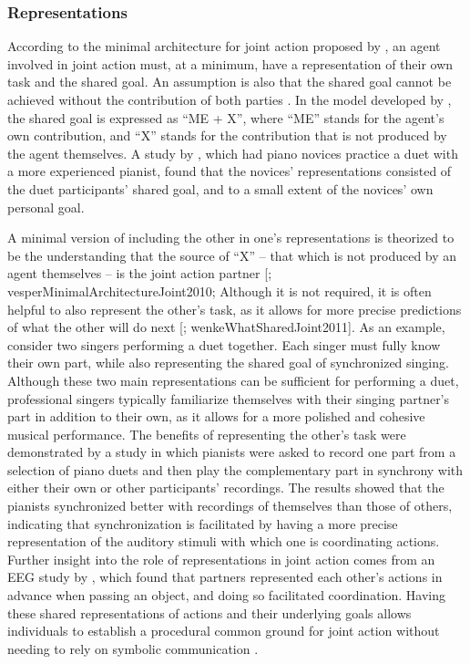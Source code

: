 \documentclass[10pt,a4paper,onecolumn]{article}
\begin{document}
\hypertarget{representations}{%
\subsubsection{Representations}\label{representations}}

According to the minimal architecture for joint action proposed by \textcite{vesperMinimalArchitectureJoint2010}, an agent involved in joint action must, at a minimum, have a representation of their own task and the shared goal. An assumption is also that the shared goal cannot be achieved without the contribution of both parties \autocite{vesperMinimalArchitectureJoint2010}. In the model developed by \textcite{vesperMinimalArchitectureJoint2010}, the shared goal is expressed as ``ME + X'', where ``ME'' stands for the agent's own contribution, and ``X'' stands for the contribution that is not produced by the agent themselves. A study by \textcite{loehrSoundYouMe2016}, which had piano novices practice a duet with a more experienced pianist, found that the novices' representations consisted of the duet participants' shared goal, and to a small extent of the novices' own personal goal.

A minimal version of including the other in one's representations is theorized to be the understanding that the source of ``X'' -- that which is not produced by an agent themselves -- is the joint action partner {[}\textcite{loehrSoundYouMe2016}; vesperMinimalArchitectureJoint2010; Although it is not required, it is often helpful to also represent the other's task, as it allows for more precise predictions of what the other will do next {[}\textcite{boltSensoryAttenuationAuditory2021}; wenkeWhatSharedJoint2011{]}. As an example, consider two singers performing a duet together. Each singer must fully know their own part, while also representing the shared goal of synchronized singing. Although these two main representations can be sufficient for performing a duet, professional singers typically familiarize themselves with their singing partner's part in addition to their own, as it allows for a more polished and cohesive musical performance. The benefits of representing the other's task were demonstrated by a study \autocite{kellerPianistsDuetBetter2007} in which pianists were asked to record one part from a selection of piano duets and then play the complementary part in synchrony with either their own or other participants' recordings. The results showed that the pianists synchronized better with recordings of themselves than those of others, indicating that synchronization is facilitated by having a more precise representation of the auditory stimuli with which one is coordinating actions. Further insight into the role of representations in joint action comes from an EEG study by \textcite{kourtisPredictiveRepresentationOther2012}, which found that partners represented each other's actions in advance when passing an object, and doing so facilitated coordination. Having these shared representations of actions and their underlying goals allows individuals to establish a procedural common ground for joint action without needing to rely on symbolic communication \autocite{sebanzJointActionBodies2006}.
\end{document}
